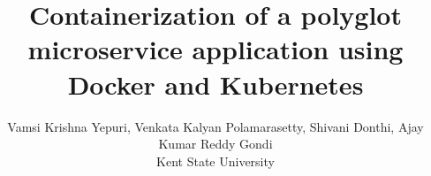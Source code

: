 \usepackage{filecontents}
\usepackage{cite}
\usepackage{amsmath,amssymb,amsfonts}
\usepackage{graphicx}
\usepackage{textcomp}
\usepackage{tabularx}
\usepackage{subcaption}
\usepackage{makecell}
\usepackage{url}
\usepackage[switch]{lineno}
\usepackage{listings}
\usepackage{multirow}
\usepackage{graphicx}

\captionsetup{compatibility=false}
\usepackage[margin=0.5in]{geometry}
\usepackage{textcomp}

\usepackage{listings}
\usepackage{tikz}
\def\checkmark{\tikz\fill[scale=0.4](0,.35) -- (.25,0) -- (1,.7) -- (.25,.15) -- cycle;} 
\graphicspath{ {./images/} }




\title{ Containerization of a polyglot microservice application using
Docker and Kubernetes 
}

\author{Vamsi Krishna Yepuri,  Venkata Kalyan Polamarasetty, Shivani Donthi, Ajay Kumar Reddy Gondi \\
Kent State University}

